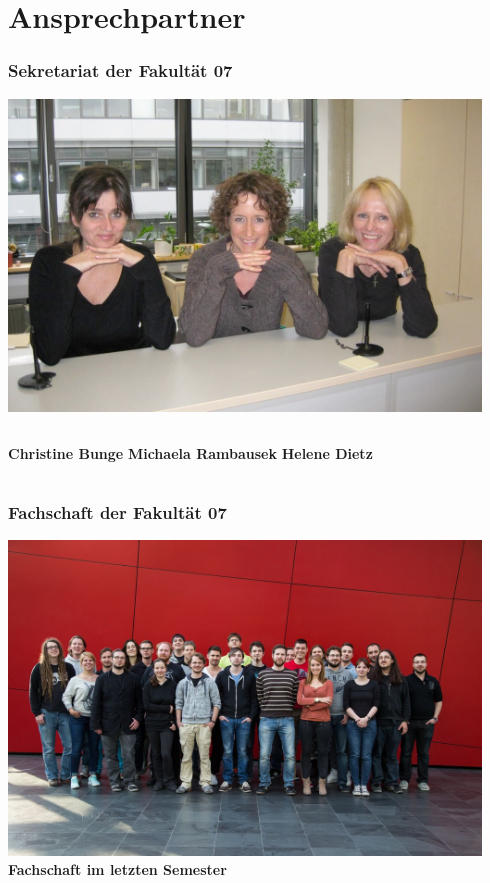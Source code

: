 \documentclass{beamer}
\begin{document}
    \section{Ansprechpartner}
    
    \begin{frame} 
    	\frametitle{Sekretariat der Fakultät 07}
    	\includegraphics[width=0.94\textwidth]{sekretariat.jpg}
    	\begin{columns}[t]
    		\textbf{Christine Bunge}
    		\textbf{Michaela Rambausek}
    		\textbf{Helene Dietz}
    	\end{columns}
    \end{frame}
    
    \begin{frame} 
        \frametitle{Fachschaft der Fakultät 07}
        \includegraphics[width=0.94\textwidth]{fachschaft.jpg}
        \\
        \textbf{Fachschaft im letzten Semester}
    \end{frame}
    
\end{document}
